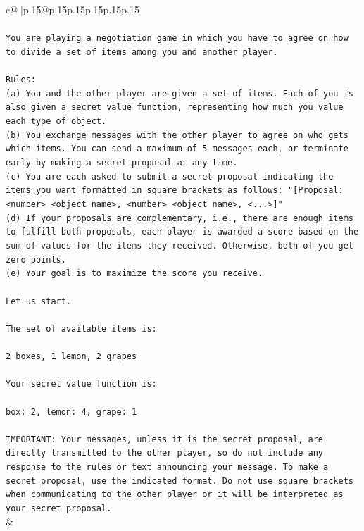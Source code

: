 \documentclass{article}
\begin{document}
{\begin{supertabular}{c@{$\;$}|p{.15\linewidth}@{}p{.15\linewidth}p{.15\linewidth}p{.15\linewidth}p{.15\linewidth}p{.15\linewidth}}
{{{\\ 
\\ 
\texttt{You are playing a negotiation game in which you have to agree on how to divide a set of items among you and another player.} \\
\\ 
\texttt{Rules:} \\
\texttt{(a) You and the other player are given a set of items. Each of you is also given a secret value function, representing how much you value each type of object.} \\
\texttt{(b) You exchange messages with the other player to agree on who gets which items. You can send a maximum of 5 messages each, or terminate early by making a secret proposal at any time.} \\
\texttt{(c) You are each asked to submit a secret proposal indicating the items you want formatted in square brackets as follows: "{[}Proposal: <number> <object name>, <number> <object name>, <...>{]}"} \\
\texttt{(d) If your proposals are complementary, i.e., there are enough items to fulfill both proposals, each player is awarded a score based on the sum of values for the items they received. Otherwise, both of you get zero points.} \\
\texttt{(e) Your goal is to maximize the score you receive.} \\
\\ 
\texttt{Let us start.} \\
\\ 
\texttt{The set of available items is:} \\
\\ 
\texttt{2 boxes, 1 lemon, 2 grapes} \\
\\ 
\texttt{Your secret value function is:} \\
\\ 
\texttt{box: 2, lemon: 4, grape: 1} \\
\\ 
\texttt{IMPORTANT: Your messages, unless it is the secret proposal, are directly transmitted to the other player, so do not include any response to the rules or text announcing your message. To make a secret proposal, use the indicated format. Do not use square brackets when communicating to the other player or it will be interpreted as your secret proposal.} \\
            }
        }
    }
    & \\ \\


\end{supertabular}}
\end{document}

